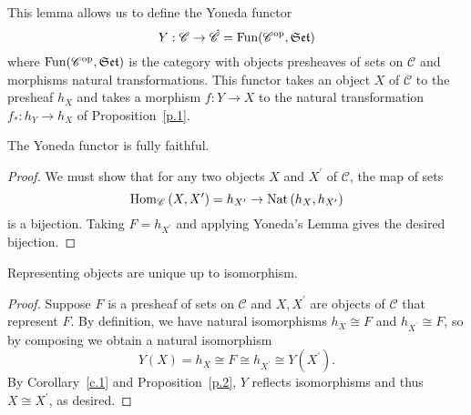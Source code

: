 \documentclass[dissertation.tex]{subfiles}
\begin{document}
This lemma allows us to define the Yoneda functor
$$Y : \mathscr{C} \rightarrow \hat{\mathscr{C}} = \operatorname{Fun}(\mathscr{C}^\text{op}, \mathfrak{Set})$$
where $\operatorname{Fun}(\mathscr{C}^\text{op}, \mathfrak{Set})$ is the category with objects presheaves of sets on $\mathscr{C}$ and morphisms natural transformations.
This functor takes an object $X$ of $\mathscr{C}$ to the presheaf $h_X$ and takes a morphism $f : Y \rightarrow X$ to the natural transformation $f_* : h_Y \rightarrow h_X$ of Proposition~\ref{p.1}.

\begin{cor}\label{c.1}
  The Yoneda functor is fully faithful.

  \begin{proof}
    We must show that for any two objects $X$ and $X^\prime$ of $\mathscr{C}$, the map of sets
    $$\operatorname{Hom}_{\mathscr{C}}\left(X,X^\prime\right) = h_{X^\prime} \rightarrow \operatorname{Nat}\left(h_X,h_{X^\prime}\right)$$
    is a bijection.
    Taking $F = h_{X^\prime}$ and applying Yoneda's Lemma gives the desired bijection.
  \end{proof}
\end{cor}

\begin{cor}
  Representing objects are unique up to isomorphism.

  \begin{proof}
    Suppose $F$ is a presheaf of sets on $\mathscr{C}$ and $X, X^\prime$ are objects of $\mathscr{C}$ that represent $F$.
    By definition, we have natural isomorphisms $h_X \cong F$ and $h_{X^\prime} \cong F$, so by composing we obtain a natural isomorphism
    $$Y(X) = h_X \cong F \cong h_{X^\prime} \cong Y(X^\prime).$$
    By Corollary~\ref{c.1} and Proposition~\ref{p.2}, $Y$ reflects isomorphisms and thus $X \cong X^\prime$, as desired.
  \end{proof}
\end{cor}
\end{document}
